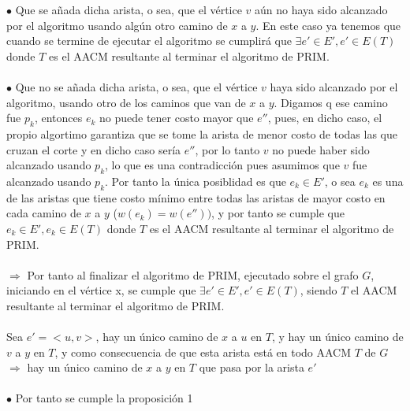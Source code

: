 \documentclass{article}
\begin{document}
    $\bullet$ Que se a\~nada dicha arista, o sea, que el v\'ertice $v$ a\'un no haya sido alcanzado por el algoritmo usando alg\'un otro camino de $x$ a $y$. En este caso ya tenemos que cuando 
    se termine de ejecutar el algoritmo se cumplir\'a que $\exists e' \in E', e' \in E(T)$ donde $T$ es el AACM resultante al terminar el algoritmo de PRIM.\\\\

    $\bullet$ Que no se a\~nada dicha arista, o sea, que el v\'ertice $v$ haya sido alcanzado por el algoritmo, usando otro de los caminos que van de $x$ a $y$.
    Digamos q ese camino fue $p_k$, entonces $e_k$ no puede tener costo mayor que $e''$, pues, en dicho caso, el propio algortimo garantiza que se tome la arista de menor costo
    de todas las que cruzan el corte y en dicho caso ser\'ia $e''$, por lo tanto $v$ no puede haber sido alcanzado usando $p_k$, lo que es una contradicci\'on pues asumimos que $v$
    fue alcanzado usando $p_k$. Por tanto la \'unica posiblidad es que $e_k \in E'$, o sea $e_k$ es una de las aristas que tiene costo m\'inimo entre todas las aristas
    de mayor costo en cada camino de $x$ a $y$ ($w(e_k) = w(e''))$, y por tanto se cumple que $e_k \in E', e_k \in E(T)$ donde $T$ es el AACM resultante al terminar el algoritmo de PRIM.\\\\

    $\Rightarrow$ Por tanto al finalizar el algoritmo de PRIM, ejecutado sobre  el grafo $G$, iniciando en el v\'ertice x, se cumple que 
    $\exists e' \in E', e' \in E(T)$, siendo $T$ el AACM resultante al terminar el algoritmo de PRIM.\\\\

    Sea $e' = <u,v>$, hay un \'unico camino de $x$ a $u$ en $T$, y hay un \'unico camino de $v$ a $y$ en $T$, y como consecuencia de que esta arista est\'a en todo AACM $T$ de $G$
    $\Rightarrow$ hay un \'unico camino de $x$ a $y$ en $T$ que pasa por la arista $e'$\\\\

    $\bullet$ Por tanto se cumple la proposici\'on 1\\\\
\end{document}
